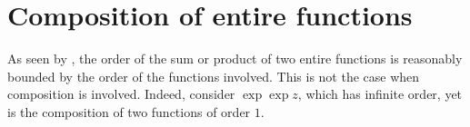 \chapter{Composition of entire functions}
\label{ch:composition-entire-functions}

As seen by , the order of the sum or product of two entire functions is reasonably bounded by the order of the functions involved. This is not the case when composition is involved. Indeed, consider $\exp \exp z$, which has infinite order, yet is the composition of two functions of order $1$. 

